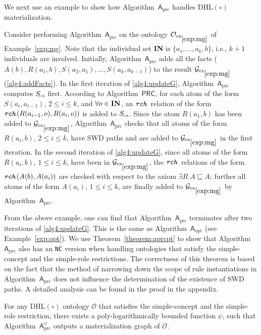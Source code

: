 We next use an example to show how Algorithm~$\mathsf{A}_{\text{prc}}$ handles
DHL$(\circ)$ materialization.

\begin{example}\label{exp:prc}
Consider performing Algorithm~$\mathsf{A}_{\text{prc}}$ on the ontology
$\mathcal{O}_{\text{ex}_{\ref{exp:mg}}}$ of Example~\ref{exp:mg}. Note that the individual
set \textbf{IN} is $\{a_1,...,a_k,b\}$, i.e., $k+1$ individuals are involved.
Initially, Algorithm~$\mathsf{A}_{\text{prc}}$ adds
all the facts ($A(b),R(a_1,b),S(a_2,a_1),...,S(a_{k},a_{k-1})$) to the
result $\mathcal{G}_{\text{ex}_{\ref{exp:mg}}}$ (\ref{alg4:addFacts}). In the first iteration of
\ref{alg4:updateG}, Algorithm~$\mathsf{A}_{\text{prc}}$ computes $S_{\textit{\!\tiny rch}}$ first.
According to Algorithm~$\mathsf{PRC}$, for each atom of the form
$S(a_i,a_{i-1})$, $2\leq i\leq k$,
and $\forall o\in \mbox{\textbf{IN}}$,
an $\texttt{\emph{rch}}$ relation of the form $\texttt{\emph{rch}}(R(a_{i-1},o),R(a_i,o))$ is added to
$S_{\textit{\!\tiny rch}}$. Since the atom $R(a_1,b)$ has been added to $\mathcal{G}_{\text{ex}_{\ref{exp:mg}}}$,
Algorithm~$\mathsf{A}_{\text{prc}}$ checks that all atoms of the form
$R(a_i,b)$, $2\leq i\leq k$,
have SWD paths and are added to $\mathcal{G}_{\text{ex}_{\ref{exp:mg}}}$ in the first iteration.
In the second iteration of \ref{alg4:updateG}, since all atoms of the
form $R(a_i,b)$, $1\leq i\leq k$,
have been in $\mathcal{G}_{\text{ex}_{\ref{exp:mg}}}$, the $\texttt{\emph{rch}}$ relations of the form $\texttt{\emph{rch}}(A(b),A(a_i))$
are checked with respect to the axiom $\exists R.A\sqsubseteq A$; further all
atoms of the form $A(a_i)$, $1\leq i\leq k$, are finally added to $\mathcal{G}_{\text{ex}_{\ref{exp:mg}}}$
by Algorithm~$\mathsf{A}_{\text{prc}}$.
\end{example}

From the above example, one can find that Algorithm~$\mathsf{A}_{\text{prc}}$ terminates after two iterations
of \ref{alg4:updateG}. This is the same as Algorithm~$\mathsf{A}_{\text{opt}}$ (see Example~\ref{exp:opt}).
We use Theorem~\ref{theorem:aprcpt} to show that Algorithm~$\mathsf{A}_{\text{prc}}$ also has an \texttt{NC} version when handling ontologies
that satisfy the simple-concept and the simple-role restrictions.
The correctness of this theorem is based on the fact that the method of narrowing down the scope of rule instantiations in Algorithm~$\mathsf{A}_{\text{prc}}$
does not influence the determination of the existence of SWD paths. A detailed analysis
can be found in the proof in the appendix.

\begin{theorem}\label{theorem:aprcpt}
For any DHL$(\circ)$ ontology $\mathcal{O}$ that satisfies the simple-concept and the simple-role
restriction,
there exists a poly-logarithmically bounded function $\psi$,
such that Algorithm~$\mathsf{A}_{\text{prc}}^{\psi}$ outputs
a materialization graph of $\mathcal{O}$.
\end{theorem}




